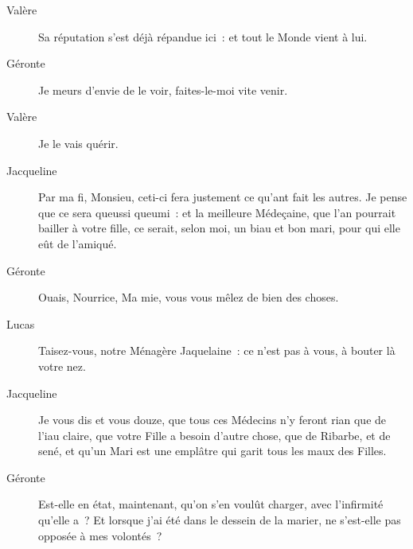 \documentclass[french,twoside]{book} %
\begin{document}
 \begin{description} \item[Valère] 

Sa réputation s’est déjà répandue ici : et tout le Monde vient à lui.\end{description}
 \begin{description} \item[Géronte] 

Je meurs d’envie de le voir, faites-le-moi vite venir.\end{description}
 \begin{description} \item[Valère] 

Je le vais quérir.\end{description}
 \begin{description} \item[Jacqueline] 

Par ma fi, Monsieu, ceti-ci fera justement ce qu’ant fait les autres. Je pense que ce sera queussi queumi : et la meilleure Médeçaine, que l’an pourrait bailler à votre fille, ce serait, selon moi, un biau et bon mari, pour qui elle eût de l’amiqué.\end{description}
 \begin{description} \item[Géronte] 

Ouais, Nourrice, Ma mie, vous vous mêlez de bien des choses.\end{description}
 \begin{description} \item[Lucas] 

Taisez-vous, notre Ménagère Jaquelaine : ce n’est pas à vous, à bouter là votre nez.\end{description}
 \begin{description} \item[Jacqueline] 

Je vous dis et vous douze, que tous ces Médecins n’y feront rian que de l’iau claire, que votre Fille a besoin d’autre chose, que de Ribarbe, et de sené, et qu’un Mari est une emplâtre qui garit tous les maux des Filles.\end{description}
 \begin{description} \item[Géronte] 

Est-elle en état, maintenant, qu’on s’en voulût charger, avec l’infirmité qu’elle a ? Et lorsque j’ai été dans le dessein de la marier, ne s’est-elle pas opposée à mes volontés ?\end{description}
\end{document}
